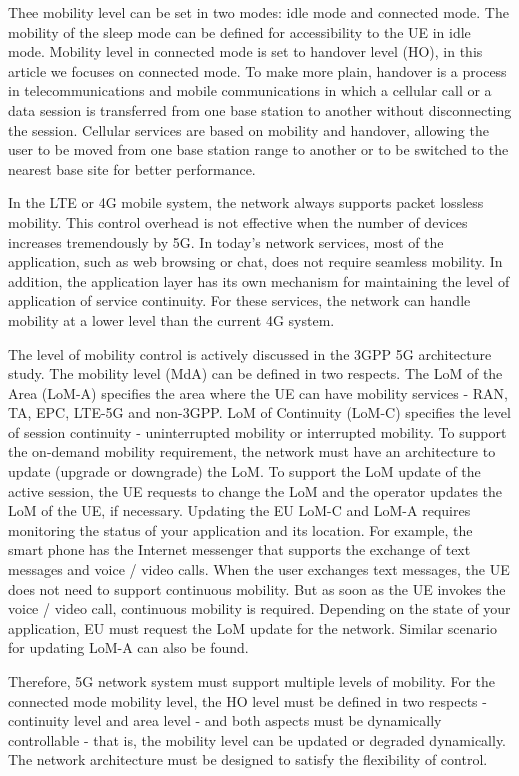 \documentclass[12pt]{article}
\begin{document}
Thee mobility level can be set in two modes: idle mode and connected mode. The mobility of the sleep mode can be defined for accessibility to the UE in idle mode. Mobility level in connected mode is set to handover level (HO), in this article we focuses on connected mode. To make more plain, handover is a process in telecommunications and mobile communications in which a cellular call or a data session is transferred from one base station to another without disconnecting the session. Cellular services are based on mobility and handover, allowing the user to be moved from one base station range to another or to be switched to the nearest base site for better performance.

In the LTE or 4G mobile system, the network always supports packet lossless mobility. This control overhead is not effective when the number of devices increases tremendously by 5G. In today's network services, most of the application, such as web browsing or chat, does not require seamless mobility. In addition, the application layer has its own mechanism for maintaining the level of application of service continuity. For these services, the network can handle mobility at a lower level than the current 4G system.

The level of mobility control is actively discussed in the 3GPP 5G architecture study. The mobility level (MdA) can be defined in two respects. The LoM of the Area (LoM-A) specifies the area where the UE can have mobility services - RAN, TA, EPC, LTE-5G and non-3GPP. LoM of Continuity (LoM-C) specifies the level of session continuity - uninterrupted mobility or interrupted mobility. To support the on-demand mobility requirement, the network must have an architecture to update (upgrade or downgrade) the LoM. To support the LoM update of the active session, the UE requests to change the LoM and the operator updates the LoM of the UE, if necessary. Updating the EU LoM-C and LoM-A requires monitoring the status of your application and its location. For example, the smart phone has the Internet messenger that supports the exchange of text messages and voice / video calls. When the user exchanges text messages, the UE does not need to support continuous mobility. But as soon as the UE invokes the voice / video call, continuous mobility is required. Depending on the state of your application, EU must request the LoM update for the network. Similar scenario for updating LoM-A can also be found.

Therefore, 5G network system must support multiple levels of mobility. For the connected mode mobility level, the HO level must be defined in two respects - continuity level and area level - and both aspects must be dynamically controllable - that is, the mobility level can be updated or degraded dynamically. The network architecture must be designed to satisfy the flexibility of control.
\end{document}
